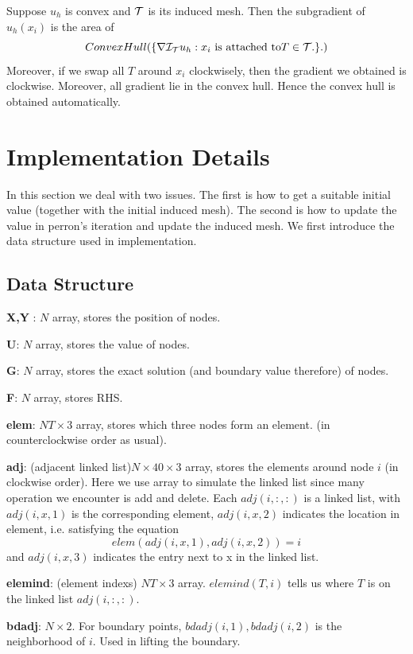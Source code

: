 \documentclass{article}
\begin{document}
\begin{proposition}
	Suppose $u_h$ is convex and $\mathcal T$ is its induced mesh. Then the subgradient of $u_h(x_i)$ is the area of
	$$ConvexHull( \{\nabla \mathcal I_{\mathcal T}u_h: x_i \text{ is attached to} T \in \mathcal T.\}.)$$
	Moreover, if we swap all $T$ around $x_i$ clockwisely, then the gradient we obtained is clockwise. Moreover, all gradient lie in the convex hull. Hence the convex hull is obtained automatically.
\end{proposition}

\section{Implementation Details}
In this section we deal with two issues. The first is how to get a suitable initial value (together with the initial induced mesh). The second is how to update the value in perron's iteration and update the induced mesh. We first introduce the data structure used in implementation.

\subsection{Data Structure}
\textbf{X,Y} : $N$ array, stores the position of nodes.

\textbf{U}: $N$ array, stores the value of nodes.

\textbf{G}: $N$ array, stores the exact solution (and boundary value therefore) of nodes.

\textbf{F}: $N$ array, stores RHS.

\textbf{elem}: $NT\times 3$ array, stores which three nodes form an element. (in counterclockwise order as usual).


\textbf{adj}: (adjacent linked list)$N \times 40 \times 3$ array, stores the elements around node $i$ (in clockwise order). Here we use array to simulate the linked list since many operation we encounter is add and delete. Each $adj(i,:,:)$ is a linked list, with $adj(i,x,1)$ is the corresponding element, $adj(i,x,2)$ indicates the location in element, i.e. satisfying the equation 
$$elem(adj(i,x,1),adj(i,x,2)) = i$$
and $adj(i,x,3)$ indicates the entry next to x in the linked list.

\textbf{elemind}: (element indexs) $NT\times 3$ array. $elemind(T,i)$ tells us where $T$ is on the linked list $adj(i,:,:)$.

\textbf{bdadj}: $N\times 2$. For boundary points, $bdadj(i,1), bdadj(i,2)$ is the neighborhood of $i$. Used in lifting the boundary.
\end{document}
